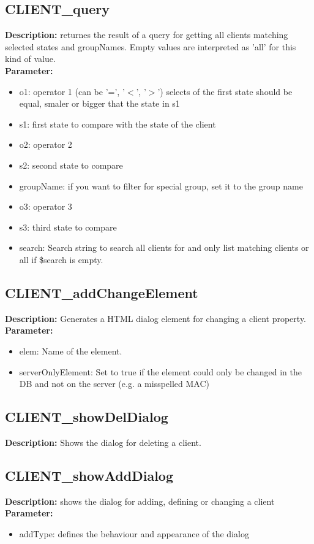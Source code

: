 \subsection{CLIENT\_query}
\textbf{Description:} returnes the result of a query for getting all clients matching selected states and groupNames. Empty values are interpreted as 'all' for this kind of value.\\
\textbf{Parameter:}
\begin{itemize}
\item o1: operator 1 (can be '=', '$<$', '$>$') selects of the first state should be equal, smaler or bigger that the state in s1
\item s1: first state to compare with the state of the client
\item o2: operator 2
\item s2: second state to compare
\item groupName: if you want to filter for special group, set it to the group name
\item o3: operator 3
\item s3: third state to compare
\item search: Search string to search all clients for and only list matching clients or all if \$search is empty.
\end{itemize}

\subsection{CLIENT\_addChangeElement}
\textbf{Description:} Generates a HTML dialog element for changing a client property.\\
\textbf{Parameter:}
\begin{itemize}
\item elem: Name of the element.
\item serverOnlyElement: Set to true if the element could only be changed in the DB and not on the server (e.g. a misspelled MAC)
\end{itemize}

\subsection{CLIENT\_showDelDialog}
\textbf{Description:} Shows the dialog for deleting a client.\\

\subsection{CLIENT\_showAddDialog}
\textbf{Description:} shows the dialog for adding, defining or changing a client\\
\textbf{Parameter:}
\begin{itemize}
\item addType: defines the behaviour and appearance of the dialog
\end{itemize}

